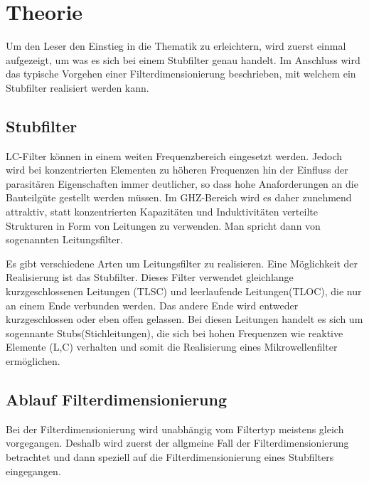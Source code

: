 \section{Theorie}

Um den Leser den Einstieg in die Thematik zu erleichtern, wird zuerst einmal aufgezeigt, um was es sich bei einem Stubfilter genau handelt. Im Anschluss wird das typische Vorgehen einer Filterdimensionierung beschrieben, mit welchem ein Stubfilter realisiert werden kann.

\subsection{Stubfilter}

LC-Filter können in einem weiten Frequenzbereich eingesetzt werden. Jedoch wird bei konzentrierten Elementen zu höheren Frequenzen hin der Einfluss der parasitären Eigenschaften immer deutlicher, so dass hohe Anaforderungen an die Bauteilgüte gestellt werden müssen. Im GHZ-Bereich wird es daher zunehmend attraktiv, statt konzentrierten Kapazitäten und Induktivitäten verteilte Strukturen in Form von Leitungen zu verwenden. Man spricht dann von sogenannten Leitungsfilter.

Es gibt verschiedene Arten um Leitungsfilter zu realisieren. Eine Möglichkeit der Realisierung ist das Stubfilter. Dieses Filter verwendet gleichlange kurzgeschlossenen Leitungen (TLSC) und leerlaufende Leitungen(TLOC), die nur an einem Ende verbunden werden. Das andere Ende wird entweder kurzgeschlossen oder eben offen gelassen. Bei diesen Leitungen handelt es sich um sogennante Stubs(Stichleitungen), die sich bei hohen Frequenzen wie reaktive Elemente (L,C) verhalten und somit die Realisierung eines Mikrowellenfilter ermöglichen.

\newpage


\subsection{Ablauf Filterdimensionierung}

Bei der Filterdimensionierung wird unabhängig vom Filtertyp meistens gleich vorgegangen. Deshalb wird zuerst der allgmeine Fall der Filterdimensionierung betrachtet und dann speziell auf die Filterdimensionierung eines Stubfilters eingegangen.

